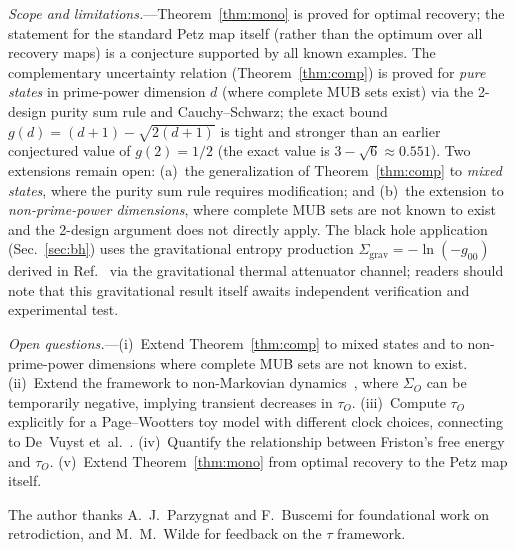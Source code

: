 \documentclass[prl,twocolumn,superscriptaddress,longbibliography,floatfix]{revtex4-2}
\newcommand{\tauasym}{\tau}
\begin{document}
\emph{Scope and limitations.}---Theorem~\ref{thm:mono} is proved
for optimal recovery; the statement for the standard Petz map
itself (rather than the optimum over all recovery maps) is a
conjecture supported by all known examples.  The complementary
uncertainty relation (Theorem~\ref{thm:comp}) is proved for
\emph{pure states} in prime-power dimension $d$ (where complete
MUB sets exist) via the 2-design purity sum rule and
Cauchy--Schwarz; the exact bound
$g(d) = (d+1) - \sqrt{2(d+1)}$ is tight and stronger than
an earlier conjectured value of $g(2) = 1/2$ (the exact value is
$3 - \sqrt{6} \approx 0.551$).  Two extensions remain open:
(a)~the generalization of Theorem~\ref{thm:comp} to
\emph{mixed states}, where the purity sum rule requires
modification; and (b)~the extension to \emph{non-prime-power
dimensions}, where complete MUB sets are not known to exist and
the 2-design argument does not directly apply.
The black hole application (Sec.~\ref{sec:bh}) uses the
gravitational entropy production
$\Sigma_{\mathrm{grav}} = -\ln(-g_{00})$ derived in
Ref.~\cite{Paper2} via the gravitational thermal attenuator
channel; readers should note that this gravitational result
itself awaits independent verification and experimental test.

\emph{Open questions.}---(i)~Extend
Theorem~\ref{thm:comp} to mixed states and to
non-prime-power dimensions where complete MUB sets are
not known to exist.
(ii)~Extend the framework to non-Markovian
dynamics~\cite{Breuer2016}, where $\Sigma_O$ can be temporarily
negative, implying transient decreases in $\tauasym_O$.
(iii)~Compute $\tauasym_O$ explicitly for a Page--Wootters
toy model with different clock choices, connecting to
De~Vuyst et~al.~\cite{DeVuyst2025}.
(iv)~Quantify the relationship between Friston's free
energy~\cite{Friston2010} and $\tauasym_O$.
(v)~Extend Theorem~\ref{thm:mono} from optimal recovery to
the Petz map itself.


\begin{acknowledgments}
The author thanks A.~J.~Parzygnat and F.~Buscemi for
foundational work on retrodiction, and M.~M.~Wilde for
feedback on the $\tauasym$ framework.
\end{acknowledgments}

\end{document}
